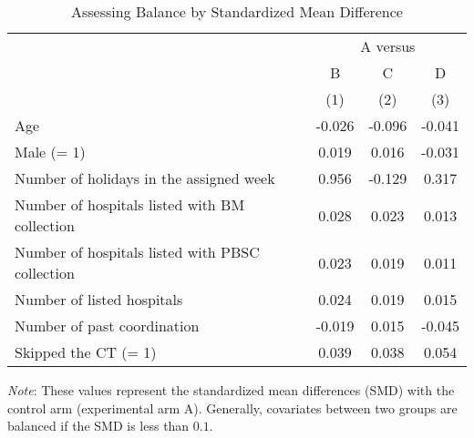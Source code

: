 \documentclass[12pt, a4paper]{article}
\begin{document}
\begin{table}[H]

\caption{\label{tab:smd-balance}Assessing Balance by Standardized Mean Difference}
\centering
\fontsize{8}{10}\selectfont
\begin{threeparttable}
\begin{tabular}[t]{lccc}
\toprule
\multicolumn{1}{c}{ } & \multicolumn{3}{c}{A versus} \\
\cmidrule(l{3pt}r{3pt}){2-4}
\multicolumn{1}{c}{ } & \multicolumn{1}{c}{B} & \multicolumn{1}{c}{C} & \multicolumn{1}{c}{D} \\
\cmidrule(l{3pt}r{3pt}){2-2} \cmidrule(l{3pt}r{3pt}){3-3} \cmidrule(l{3pt}r{3pt}){4-4}
 & (1) & (2) & (3)\\
\midrule
Age & -0.026 & -0.096 & -0.041\\
Male (= 1) & 0.019 & 0.016 & -0.031\\
Number of holidays in the assigned week & 0.956 & -0.129 & 0.317\\
Number of hospitals listed with BM collection & 0.028 & 0.023 & 0.013\\
Number of hospitals listed with PBSC collection & 0.023 & 0.019 & 0.011\\
Number of listed hospitals & 0.024 & 0.019 & 0.015\\
Number of past coordination & -0.019 & 0.015 & -0.045\\
Skipped the CT (= 1) & 0.039 & 0.038 & 0.054\\
\bottomrule
\end{tabular}
\begin{tablenotes}
\item \emph{Note}: These values represent the standardized mean differences (SMD) with the control arm (experimental arm A). Generally, covariates between two groups are balanced if the SMD is less than $0.1$.
\end{tablenotes}
\end{threeparttable}
\end{table}
\end{document}
